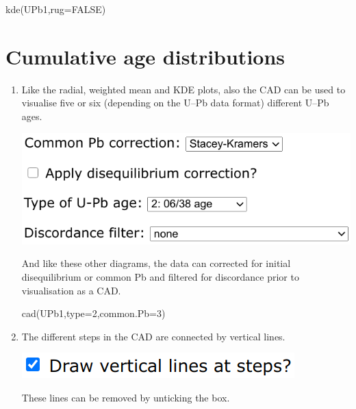 \begin{refsection}
\begin{enumerate}
\begin{console}
kde(UPb1,rug=FALSE)
\end{console}

\end{enumerate}

\section{Cumulative age distributions}
\label{sec:UPbCAD}

\begin{enumerate}

\item Like the radial, weighted mean and KDE plots, also the CAD can
  be used to visualise five or six (depending on the U--Pb data
  format) different U--Pb ages.

\noindent\begin{minipage}[t]{.5\linewidth}
\strut\vspace*{-\baselineskip}\newline
\includegraphics[width=\linewidth]{../figures/UPbCADageTypes.png}
\end{minipage}
\begin{minipage}[t]{.5\linewidth}
  And like these other diagrams, the data can corrected for initial
  disequilibrium or common Pb and filtered for discordance prior to
  visualisation as a CAD.
\end{minipage}

\begin{console}
cad(UPb1,type=2,common.Pb=3)
\end{console}

\item The different steps in the CAD are connected by vertical lines.

\noindent\begin{minipage}[t]{.3\linewidth}
\strut\vspace*{-\baselineskip}\newline
\includegraphics[width=\linewidth]{../figures/UPbCADverticals.png}
\end{minipage}
\begin{minipage}[t]{.7\linewidth}
  These lines can be removed by unticking the box.
\end{minipage}


\end{enumerate}
\end{refsection}
